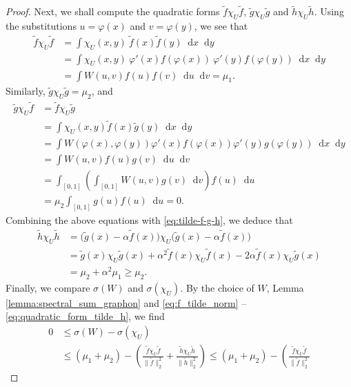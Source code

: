 \documentclass[11pt]{article}
\theoremstyle{plain}
\theoremstyle{definition}
\numberwithin{equation}{section}
\newcommand{\dif}{\mathop{}\!\mathrm{d}}
\begin{document}
\begin{proof}
Next, we shall compute the quadratic forms $\tilde{f}\chi_U \tilde{f}$, 
$\tilde{g}\chi_U\tilde{g}$ and $\tilde{h}\chi_U\tilde{h}$. 
Using the substitutions $u = \varphi (x)$ and $v = \varphi (y)$, we see that
\begin{align}\label{eq:quadratic_form_tilde_f}
\tilde{f} \chi_U \tilde{f} 
& = \int \chi_{U}(x,y)\ \tilde{f}(x) \tilde{f}(y) \dif{x}\dif{y} \nonumber \\
& = \int \chi_{U}(x,y)\ \varphi'(x)f(\varphi(x)) \ \varphi'(y)f(\varphi(y)) \dif{x}\dif{y} \nonumber \\
& = \int W(u,v) f(u)f(v) \dif{u}\dif{v} = \mu_1.
\end{align}
Similarly, $\tilde{g} \chi_U \tilde{g} = \mu_2$, and
\begin{align*} \tilde{g} \chi_U \tilde{f} 
& = \tilde{f} \chi_U \tilde{g} \\ 
& = \int \chi_{U}(x,y) \tilde{f}(x) \tilde{g}(y) \dif{x}\dif{y} \\
& = \int W(\varphi(x), \varphi(y)) \varphi'(x)f(\varphi(x)) \varphi'(y)g(\varphi(y)) \dif{x}\dif{y} \\
& = \int W(u,v) f(u)g(v) \dif{u}\dif{v} \\
& = \int_{[0,1]} \left(\int_{[0,1]} W(u,v) g(v)\dif{v}\right) f(u)\dif{u} \\
& = \mu_2 \int_{[0,1]} g(u)f(u) \dif{u} = 0.
\end{align*}
Combining the above equations with \eqref{eq:tilde-f-g-h}, we deduce that
\begin{align}\label{eq:quadratic_form_tilde_h}
\tilde{h} \chi_U \tilde{h} 
& = \big(\tilde{g}(x) - \alpha \tilde{f}(x)\big) \chi_U \big(\tilde{g}(x) - \alpha \tilde{f}(x)\big) \nonumber \\
& = \tilde{g}(x)\chi_U\tilde{g}(x) + \alpha^2\tilde{f}(x)\chi_U\tilde{f}(x) - 2\alpha\tilde{f}(x)\chi_U\tilde{g}(x) \nonumber \\
& = \mu_2 + \alpha^2 \mu_1 \geq \mu_2.
\end{align}
Finally, we compare $\sigma(W)$ and $\sigma(\chi_U)$. By the choice of $W$, 
Lemma \ref{lemma:spectral_sum_graphon} and \eqref{eq:f_tilde_norm} -- \eqref{eq:quadratic_form_tilde_h}, we find
\begin{align*}
0 & \leq \sigma(W) - \sigma(\chi_U) \\
& \leq (\mu_1 + \mu_2) - \left(\frac{\tilde{f}\chi_U \tilde{f}}{\|\tilde{f} \|_2^2} 
+ \frac{\tilde{h} \chi_U \tilde{h}}{\| \tilde{h} \|_2^2}\right) 
\leq (\mu_1 + \mu_2) - \left(\frac{\tilde{f}\chi_U \tilde{f}}{\| \tilde{f} \|_2^2 } 

\end{align*}
\end{proof}
\end{document}
